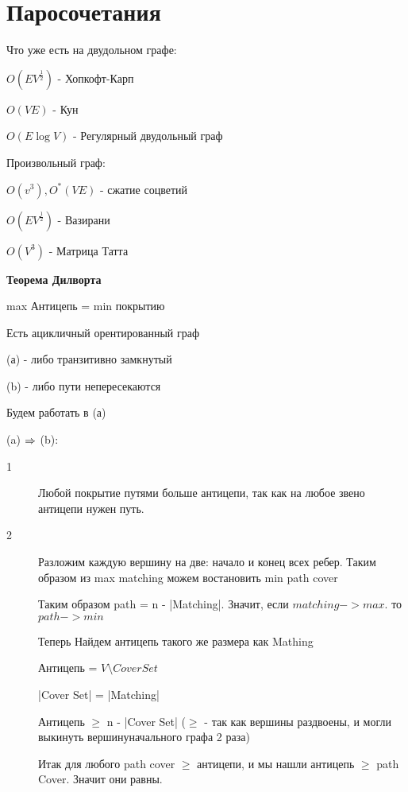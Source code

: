 ﻿

\section{Паросочетания}

Что уже есть на двудольном графе:

$O(E V^{\frac{1}{2}})$ - Хопкофт-Карп

$O(VE)$ - Кун

$O(E \log{V})$ - Регулярный двудольный граф

Произвольный граф:

$O(v^3), O^*(VE)$ - сжатие соцветий

$O(E V^{\frac{1}{2}})$ - Вазирани

$O(V^3)$ - Матрица Татта

\begin{theorem}{\bf Теорема Дилворта}
    
    max Антицепь = min покрытию
\end{theorem}
\begin{lemma}{}
Есть ацикличный орентированный граф

(а) - либо транзитивно замкнутый

(b) - либо пути непересекаются

Будем работать в (а)

(a) $\Rightarrow$ (b):


\end{lemma}

\begin{description}
\item[1] 

Любой покрытие путями больше антицепи, так как на любое звено антицепи нужен путь.

\item[2] 
Разложим каждую вершину на две: начало и конец всех ребер. Таким образом из  max matching можем востановить min path cover



Таким образом path = n - |Matching|. Значит, если $matching -> max$. то $path -> min$

Теперь Найдем антицепь такого же размера как Mathing

Антицепь = $V \setminus {Cover Set}$



|Cover Set| = |Matching|

Антицепь $\ge$ n - |Cover Set|  ($\ge$ - так как вершины раздвоены, и могли выкинуть вершинуначального графа 2 раза)

Итак для любого path cover $\ge$ антицепи, и мы нашли антицепь $\ge$ path Cover. Значит они равны.
\end{description}

